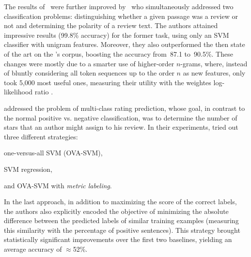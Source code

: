 
The results of~\citet{Pang:04} were further improved by~\citet{Ng:06}
who simultaneously addressed two classification problems:
distinguishing whether a given passage was a review or not and
determining the polarity of a review text.  The authors attained
impressive results (99.8\% accuracy) for the former task, using only
an SVM classifier with unigram features.  Moreover, they also
outperformed the then state of the art on the \citet{Pang:04}'s
corpus, boosting the accuracy from~87.1 to~90.5\%.  These changes were
mostly due to a smarter use of higher-order $n$-grams, where, instead
of bluntly considering all token sequences up to the order $n$ as new
features, \citet{Ng:06} only took 5,000 most useful ones, measuring
their utility with the weightes log-likelihood ratio \cite{Nigam:00}.


\citet{Pang:05} addressed the problem of multi-class rating
prediction, whose goal, in contrast to the normal positive
vs. negative classification, was to determine the number of stars that
an author might assign to his review.  In their experiments,
\citeauthor{Pang:05} tried out three different strategies:
\begin{inparaenum}[(i)]
  \item one-versus-all SVM (OVA-SVM),
  \item SVM regression,
  \item and OVA-SVM with \emph{metric labeling}.
\end{inparaenum}
In the last approach, in addition to maximizing the score of the
correct labels, the authors also explicitly encoded the objective of
minimizing the absolute difference between the predicted labels of
similar training examples (measuring this similarity with the
percentage of positive sentences).  This strategy brought
statistically significant improvements over the first two baselines,
yielding an average accuracy of $\approx$52\%.





